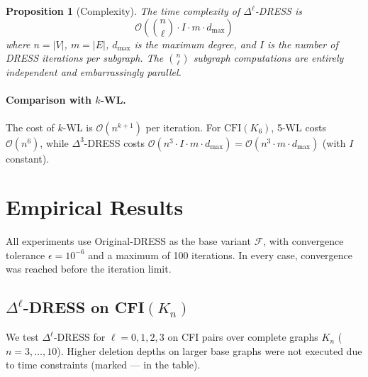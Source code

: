 \documentclass[11pt,a4paper]{article}
\newtheorem{proposition}[theorem]{Proposition}
\begin{document}
\begin{proposition}[Complexity]
The time complexity of $\Delta^\ell$-DRESS is
\[
\mathcal{O}\!\left(\binom{n}{\ell} \cdot I \cdot m \cdot d_{\max}\right)
\]
where $n = |V|$, $m = |E|$, $d_{\max}$ is the maximum degree, and $I$ is the number of DRESS iterations per subgraph. The $\binom{n}{\ell}$ subgraph computations are entirely independent and embarrassingly parallel.
\end{proposition}

\paragraph{Comparison with \texorpdfstring{$k$}{k}-WL.} The cost of $k$-WL is $\mathcal{O}(n^{k+1})$ per iteration. For $\text{CFI}(K_6)$, 5-WL costs $\mathcal{O}(n^6)$, while $\Delta^3$-DRESS costs $\mathcal{O}(n^3 \cdot I \cdot m \cdot d_{\max}) = \mathcal{O}(n^3 \cdot m \cdot d_{\max})$ (with $I$ constant).

\section{Empirical Results}

All experiments use Original-DRESS as the base variant $\mathcal{F}$, with convergence tolerance $\epsilon = 10^{-6}$ and a maximum of 100 iterations. In every case, convergence was reached before the iteration limit.

\subsection{\texorpdfstring{$\Delta^\ell$}{Delta-ell}-DRESS on \texorpdfstring{CFI$(K_n)$}{CFI(Kn)}}

We test $\Delta^\ell$-DRESS for $\ell = 0, 1, 2, 3$ on CFI pairs over complete graphs $K_n$ ($n = 3, \ldots, 10$). Higher deletion depths on larger base graphs were not executed due to time constraints (marked --- in the table).
\end{document}
